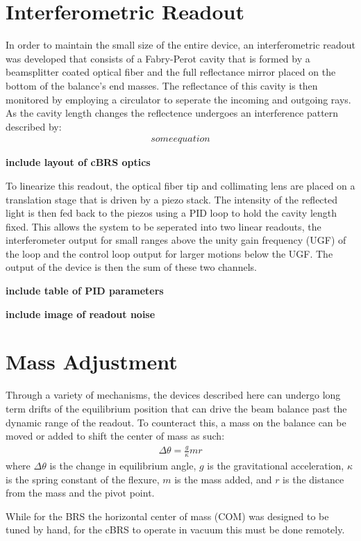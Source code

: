 \documentclass [12pt, proquest]{uwthesis}[2019]
\begin{document}
\section{Interferometric Readout}
In order to maintain the small size of the entire device, an interferometric readout was developed that consists of a Fabry-Perot cavity that is formed by a beamsplitter coated optical fiber and the full reflectance mirror placed on the bottom of the balance's end masses. The reflectance of this cavity is then monitored by employing a circulator to seperate the incoming and outgoing rays. As the cavity length changes the reflectence undergoes an interference pattern described by:
\begin{align}
some equation
\end{align}

\textbf{include layout of cBRS optics}

To linearize this readout, the optical fiber tip and collimating lens are placed on a translation stage that is driven by a piezo stack. The intensity of the reflected light is then fed back to the piezos using a PID loop to hold the cavity length fixed. This allows the system to be seperated into two linear readouts, the interferometer output for small ranges above the unity gain frequency (UGF) of the loop and the control loop output for larger motions below the UGF. The output of the device is then the sum of these two channels.

\textbf{include table of PID parameters}

\textbf{include image of readout noise}

\section{Mass Adjustment}

Through a variety of mechanisms, the devices described here can undergo long term drifts of the equilibrium position that can drive the beam balance past the dynamic range of the readout. To counteract this, a mass on the balance can be moved or added to shift the center of mass as such:
\begin{align}
\Delta \theta=\frac{g}{\kappa} m r
\end{align}
where $\Delta \theta$ is the change in equilibrium angle, $g$ is the gravitational acceleration, $\kappa$ is the spring constant of the flexure, $m$ is the mass added, and $r$ is the distance from the mass and the pivot point.

While for the BRS the horizontal center of mass (COM) was designed to be tuned by hand, for the cBRS to operate in vacuum this must be done remotely. 
\end{document}
